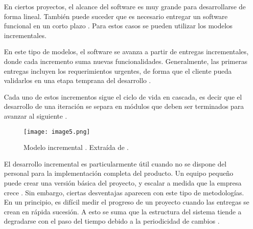 \par En ciertos proyectos, el alcance del software es muy grande para desarrollarse de forma lineal. También puede suceder que es necesario entregar un software funcional en un corto plazo \cite{pressmanIngenieriaSoftwareEnfoque2013}. Para estos casos se pueden utilizar los modelos incrementales.
\par En este tipo de modelos, el software se avanza a partir de entregas incrementales, donde cada incremento suma nuevas funcionalidades. Generalmente, las primeras entregas incluyen los requerimientos urgentes, de forma que el cliente pueda validarlos en una etapa temprana del desarrollo \cite{sommervilleIngenieriaSoftware9a2011,pressmanIngenieriaSoftwareEnfoque2013}.
\par Cada uno de estos incrementos sigue el ciclo de vida en cascada, es decir que el desarrollo de una iteración se separa en módulos que deben ser terminados para avanzar al siguiente \cite{gujarathiSpiralDevelopmentNonSoftware2024}.
%
\begin{figure}[h]
  \centering
  \texttt{[image: image5.png]}
  \caption{Modelo incremental . Extraída de \cite{pressmanIngenieriaSoftwareEnfoque2013}.}
  \label{fig:x Modelo incremental}
\end{figure}
\par El desarrollo incremental es particularmente útil cuando no se dispone del personal para la implementación completa del producto. Un equipo pequeño puede crear una versión básica del proyecto, y escalar a medida que la empresa crece \cite{pressmanIngenieriaSoftwareEnfoque2013}. 
Sin embargo, ciertas desventajas aparecen con este tipo de metodologías. En un principio, es difícil medir el progreso de un proyecto cuando las entregas se crean en rápida sucesión. A esto se suma que la estructura del sistema tiende a degradarse con el paso del tiempo debido a la periodicidad de cambios \cite{sommervilleIngenieriaSoftware9a2011}.
